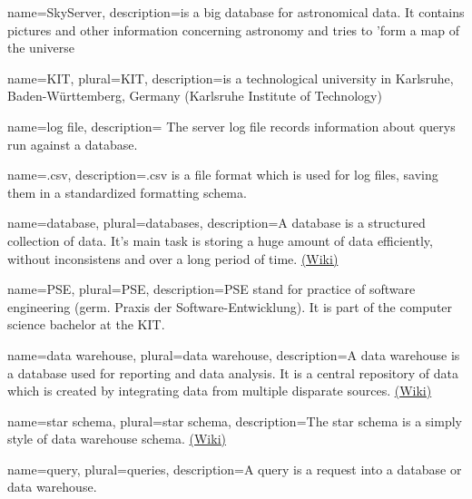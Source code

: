 {
  name=SkyServer,
  description={is a big database for astronomical data. It contains pictures
              and other information concerning astronomy and tries to 'form a 
              map of the universe
              }
}


{
  name=KIT,
  plural=KIT,
  description={is a technological university in Karlsruhe, Baden-Württemberg, Germany 
              (Karlsruhe Institute of Technology)}
}

{
  name=log file,
  description={
The server log file records information about \glspl{query} run against a  \gls{database}.}
}

{
  name=.csv,
  description={.csv is a file format which is used for log files, 
  saving them in a standardized formatting schema.}
}


{
  name=database,
  plural=databases,
  description={A database is a structured collection of data. It's main task is
  storing a huge amount of data efficiently, without inconsistens and over a long period of time.   
  \href{https://en.wikipedia.org/wiki/Database}{(Wiki)}}
}

{
  name=PSE,
  plural=PSE,
  description={PSE stand for practice of software engineering (germ. Praxis der Software-Entwicklung).
  It is part of the computer science bachelor at the \gls{KIT}.}
}

{
  name=data warehouse,
  plural=data warehouse,
  description={A data warehouse is a \gls{database} used for reporting and data analysis.
  It is a central repository of data which is created by integrating data from multiple disparate sources.
  \href{https://en.wikipedia.org/wiki/Data_warehouse}{(Wiki)}}
}
  
  
{
  name=star schema,
  plural=star schema,
  description={The star schema is a simply style of \gls{data warehouse} schema.
 \href{https://en.wikipedia.org/wiki/Star_schema}{(Wiki)}}
}

  
{
  name=query,
  plural=queries,
  description={A query is a request into a \gls{database} or \gls{data warehouse}.}
}

